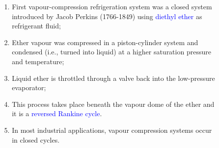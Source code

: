 \documentclass[10pt,compress]{beamer}
\begin{document}
\begin{frame}
  \begin{columns}
   \begin{column}[c]{0.45\linewidth}
    \begin{figure}%
     \begin{center}
     \end{center}
    \end{figure}  
   \end{column}  
   \begin{column}[c]{0.55\linewidth}
  \begin{enumerate}[(1)]\scriptsize
   \item <2-> First vapour-compression refrigeration system was a closed system introduced by Jacob Perkins (1766-1849) using \textcolor{blue}{diethyl ether} as refrigerant fluid;
   \item <2-> Ether vapour was compressed in a piston-cylinder system and condensed (i.e., turned into liquid) at a higher saturation pressure and temperature;
   \item <2-> Liquid ether is throttled through a valve back into the low-pressure evaporator;
   \item <2-> This process takes place beneath the vapour dome of the ether and it is a \textcolor{blue}{reversed Rankine cycle}.
   \item <3-> In most industrial applications, vapour compression systems occur in closed cycles.
  \end{enumerate}
 \end{column}  
\end{columns}

\end{frame}
\end{document}
